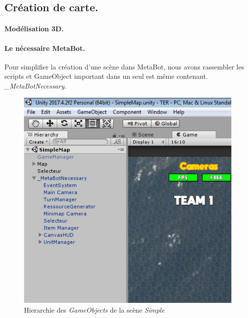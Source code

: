\documentclass{report}
\begin{document}
\subsection{Création de carte.}
\paragraph{Modélisation 3D.}
\paragraph{Le nécessaire MetaBot.} Pour simplifier la création d'une scène dans MetaBot, nous avons rassembler les scripts et GameObject important dans un seul est même contenant. \textit{\_MetaBotNecessary}.

\begin{figure}[!h]
\centering
\includegraphics[scale=0.85]{MetaBotNecessaryImage}
\caption{Hierarchie des \textit{GameObjects} de la scène \textit{Simple}}
\end{figure}
\end{document}
